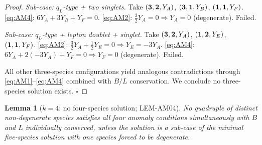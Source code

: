 \documentclass[12pt, a4paper]{article}
\newtheorem{lemma}{Lemma}[section]
\begin{document}
\begin{proof}
\emph{Sub-case: $q_L$-type + two singlets.} Take $({\bf 3},{\bf 2},Y_A)$,
$({\bf 3},{\bf 1},Y_B)$, $({\bf 1},{\bf 1},Y_F)$. \eqref{eq:AM4}:
$6 Y_A + 3 Y_B + Y_F = 0$. \eqref{eq:AM2}: $\frac{3}{2} Y_A = 0
\Rightarrow Y_A = 0$ (degenerate). Failed.

\emph{Sub-case: $q_L$-type + lepton doublet + singlet.}
Take $({\bf 3},{\bf 2},Y_A)$, $({\bf 1},{\bf 2},Y_E)$,
$({\bf 1},{\bf 1},Y_F)$. \eqref{eq:AM2}: $\frac{3}{2}Y_A +
\frac{1}{2}Y_E = 0 \Rightarrow Y_E = -3 Y_A$. \eqref{eq:AM4}:
$6 Y_A + 2(-3 Y_A) + Y_F = 0 \Rightarrow Y_F = 0$ (degenerate).
Failed.

All other three-species configurations yield analogous contradictions
through \eqref{eq:AM1}--\eqref{eq:AM4} combined with $B/L$
conservation. We conclude no three-species solution exists.
\hfill$\square$
\end{proof}

\begin{lemma}[$k = 4$: no four-species solution; LEM-AM04]
\label{lem:k4}
No quadruple of distinct non-degenerate species satisfies all
four anomaly conditions simultaneously with $B$ and $L$ individually
conserved, \emph{unless} the solution is a sub-case of the
minimal five-species solution with one species forced to be
degenerate.
\end{lemma}
\end{document}

